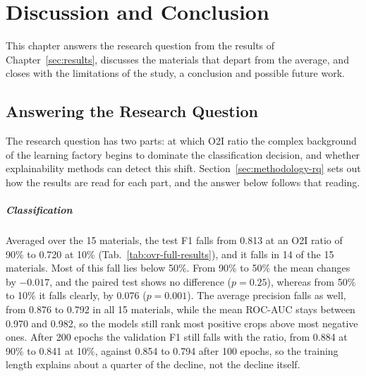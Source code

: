 \chapter{Discussion and Conclusion}
\label{sec:discussion}

This chapter answers the research question from the results of
Chapter~\ref{sec:results}, discusses the materials that depart from the average, and
closes with the limitations of the study, a conclusion and possible future work.

\section{Answering the Research Question}
\label{sec:discussion-answer}

The research question has two parts: at which O2I ratio the complex background of the
learning factory begins to dominate the classification decision, and whether
explainability methods can detect this shift. Section~\ref{sec:methodology-rq} sets out
how the results are read for each part, and the answer below follows that reading.

\paragraph{Classification}
Averaged over the 15 materials, the test F1 falls from 0.813 at an O2I ratio of 90\% to
0.720 at 10\% (Tab.~\ref{tab:ovr-full-results}), and it falls in 14 of the 15
materials. Most of this fall lies below 50\%. From 90\% to 50\% the mean changes by
$-0.017$, and the paired test shows no difference ($p = 0.25$), whereas from 50\% to
10\% it falls clearly, by 0.076 ($p = 0.001$). The average precision falls as well, from
0.876 to 0.792 in all 15 materials, while the mean ROC-AUC stays between 0.970 and
0.982, so the models still rank most positive crops above most negative ones. After 200
epochs the validation F1 still falls with the ratio, from 0.884 at 90\% to 0.841 at
10\%, against 0.854 to 0.794 after 100 epochs, so the training length explains about a
quarter of the decline, not the decline itself.

